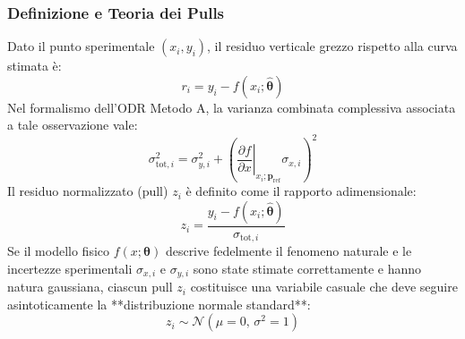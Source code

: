 \documentclass[11pt,a4paper]{article}
\begin{document}
\subsubsection{Definizione e Teoria dei Pulls}
Dato il punto sperimentale $(x_i, y_i)$, il residuo verticale grezzo rispetto alla curva stimata è:
\begin{equation}
    r_i = y_i - f(x_i; \hat{\boldsymbol{\theta}})
\end{equation}
Nel formalismo dell'ODR Metodo A, la varianza combinata complessiva associata a tale osservazione vale:
\begin{equation}
    \sigma_{\text{tot}, i}^2 = \sigma_{y, i}^2 + \left( \left.\frac{\partial f}{\partial x}\right|_{x_i; \mathbf{p}_{\text{ref}}} \sigma_{x, i} \right)^2
\end{equation}
Il residuo normalizzato (pull) $z_i$ è definito come il rapporto adimensionale:
\begin{equation}
    z_i = \frac{y_i - f(x_i; \hat{\boldsymbol{\theta}})}{\sigma_{\text{tot}, i}}
\end{equation}
Se il modello fisico $f(x; \boldsymbol{\theta})$ descrive fedelmente il fenomeno naturale e le incertezze sperimentali $\sigma_{x, i}$ e $\sigma_{y, i}$ sono state stimate correttamente e hanno natura gaussiana, ciascun pull $z_i$ costituisce una variabile casuale che deve seguire asintoticamente la **distribuzione normale standard**:
\begin{equation}
    z_i \sim \mathcal{N}(\mu = 0, \, \sigma^2 = 1)
\end{equation}
\end{document}
